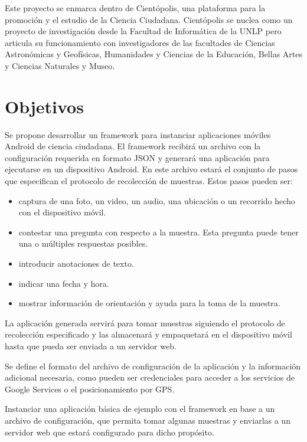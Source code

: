 Este proyecto se enmarca dentro de Cientópolis\cite{cientopolis}, una plataforma para la promoción y el estudio de la Ciencia Ciudadana. Cientópolis se nuclea como un proyecto de investigación desde la Facultad de Informática de la UNLP pero articula su funcionamiento con investigadores de las facultades de Ciencias Astronómicas y Geofísicas, Humanidades y Ciencias de la Educación, Bellas Artes y Ciencias Naturales y Museo.

\section{ Objetivos }\label{sec:objetivos}		
		
Se propone desarrollar un framework para instanciar aplicaciones móviles Android de ciencia ciudadana. El framework recibirá un archivo con la configuración requerida en formato JSON y generará una aplicación para ejecutarse en un dispositivo Android. En este archivo estará el conjunto de pasos que especifican el protocolo de recolección de muestras. Estos pasos pueden ser:
			\begin{itemize}
				\item captura de una foto, un video, un audio, una ubicación o un recorrido hecho con el dispositivo móvil.
				\item contestar una pregunta con respecto a la muestra. Esta pregunta puede tener una o múltiples respuestas posibles.
				\item introducir anotaciones de texto.
				\item indicar una fecha y hora.
				\item mostrar información de orientación y ayuda para la toma de la muestra.
			\end{itemize}

La aplicación generada servirá para tomar muestras siguiendo el protocolo de recolección especificado y las almacenará y empaquetará en el dispositivo móvil hasta que pueda ser enviada a un servidor web.
		
Se define el formato del archivo de configuración de la aplicación y la información adicional necesaria, como pueden ser credenciales para acceder a los servicios de Google Services o el posicionamiento por GPS.

Instanciar una aplicación básica de ejemplo con el framework en base a un archivo de configuración, que permita tomar algunas muestras y enviarlas a un servidor web que estará configurado para dicho propósito.

